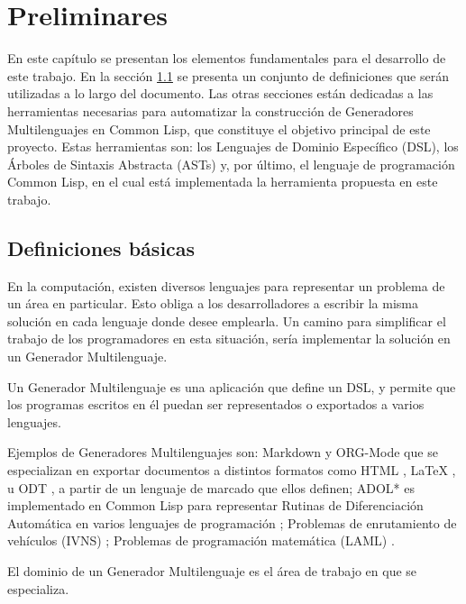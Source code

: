 \chapter{Preliminares}
\label{chap:basis}

En este capítulo se presentan los elementos fundamentales para el desarrollo de este trabajo. En la sección \ref{sec:definiciones-basicas} se presenta un conjunto de definiciones que serán utilizadas a lo largo del documento. Las otras secciones están dedicadas a las herramientas necesarias para automatizar la construcción de Generadores Multilenguajes en Common Lisp, que constituye el objetivo principal de este proyecto. Estas herramientas son: los Lenguajes de Dominio Específico (DSL), los Árboles de Sintaxis Abstracta (ASTs) y, por último, el lenguaje de programación Common Lisp, en el cual está implementada la herramienta propuesta en este trabajo.

\section{Definiciones básicas}
\label{sec:definiciones-basicas}

En la computación, existen diversos lenguajes para representar un problema de un área en particular. Esto obliga a los desarrolladores a escribir la misma solución en cada lenguaje donde desee emplearla. Un camino para simplificar el trabajo de los programadores en esta situación, sería implementar la solución en un Generador Multilenguaje.


\begin{definition}
  Un Generador Multilenguaje es una aplicación que define un DSL, y permite que los programas escritos en él puedan ser representados o exportados a varios lenguajes.
\end{definition}


Ejemplos de Generadores Multilenguajes son: Markdown \cite{markdown} y ORG-Mode \cite{emacs} que se especializan en exportar documentos a distintos formatos como HTML \cite{HTML}, LaTeX \cite{latex}, u ODT \cite{ODT}, a partir de un lenguaje de marcado que ellos definen; ADOL* es implementado en Common Lisp para representar Rutinas de Diferenciación Automática en varios lenguajes de programación \cite{Adol*}; Problemas de enrutamiento de vehículos (IVNS) \cite{cami}; Problemas de programación matemática (LAML) \cite{hoyos}.

\begin{definition}
  El dominio de un Generador Multilenguaje es el área de trabajo en que se especializa.
\end{definition}


